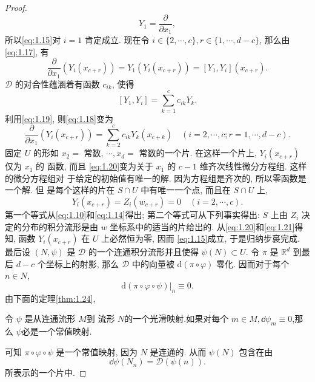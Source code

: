 \begin{proof}
\begin{equation}
    \label{eq:1.17}
    Y_1=\frac{\partial}{\partial x_1},
\end{equation}
所以\eqref{eq:1.15}对 $i=1$ 肯定成立. 现在令 $i \in\{2, \cdots, c\}, r \in\{1, \cdots, d-c\}$, 那么由\eqref{eq:1.17}, 有
\begin{equation}
    \label{eq:1.18}
    \frac{\partial}{\partial x_1}\left(Y_i\left(x_{c+r}\right)\right)=Y_1\left(Y_i\left(x_{c+r}\right)\right)=\left[Y_1, Y_i\right]\left(x_{c+r}\right) .
\end{equation}
$\mathscr{D}$ 的对合性蕴涵着有函数 $c_{i k}$, 使得
\begin{equation}
    \label{eq:1.19}
    \left[Y_1, Y_i\right]=\sum_{k=1}^c c_{i k} Y_k .
\end{equation}
利用\eqref{eq:1.19}, 则\eqref{eq:1.18}变为
\begin{equation}\label{eq:1.20}
    \frac{\partial}{\partial x_1}(Y_i (x_{c+r}))=\sum_{k=2}^c c_{ik} Y_k (x_{c+k}) \quad (i=2,\cdots,c; r=1,\cdots,d-c).
\end{equation}
固定 $U$ 的形如 $x_2=$ 常数, $\cdots, x_d=$ 常数的一个片. 在这样一个片上, $Y_i\left(x_{c+r}\right)$ 仅为 $x_1$ 的 函数, 而且 \eqref{eq:1.20}变为关于 $x_1$ 的 $c-1$ 维齐次线性微分方程组. 这样的微分方程组对 于给定的初始值有唯一的解. 因为方程组是齐次的, 所以零函数是一个解. 但 是每个这样的片在 $S \cap U$ 中有唯一一个点, 而且在 $S \cap U$ 上,
\begin{equation}
    \label{eq:1.21}
Y_i\left(x_{c+r}\right)=Z_i\left(w_{c+r}\right)=0 \quad(i=2, \cdots, c) .
\end{equation}
第一个等式从\eqref{eq:1.10}和\eqref{eq:1.14}得出; 第二个等式可从下列事实得出: $S$ 上由 $Z_i$ 决定的分布的积分流形是由 $w$ 坐标系中的适当的片给出的. 从\eqref{eq:1.20}和\eqref{eq:1.21}得知, 函数 $Y_i\left(x_{c+r}\right)$ 在 $U$ 上必然恒为零, 因而 \eqref{eq:1.15}成立, 于是归纳步裛完成.
最后设 $(N, \psi)$ 是 $\mathscr{D}$ 的一个连通积分流形并且使得 $\psi(N) \subset U$. 令 $\pi$ 是 $\mathbb{R}^d$ 到最后 $d-c$ 个坐标上的射影, 那么 $\mathscr{D}$ 中的向量被 $\mathrm{d}(\pi \circ \varphi)$ 零化. 因而对于每个 $n \in N$,
$$
\left.\mathrm{d}(\pi \circ \varphi \circ \psi)\right|_n \equiv 0 .
$$
由下面的定理\ref{thm:1.24},
\begin{thm}\label{thm:1.24}
    令 $\psi$ 是从连通流形 $M$到 流形 $N$的一个光滑映射.如果对每个 $m\in M,\dd \psi_m\equiv 0$,那么 $\psi$必是一个常值映射.
\end{thm}
可知 $\pi \circ \varphi \circ \psi$ 是一个常值映射, 因为 $N$ 是连通的. 从而 $\psi(N)$ 包含在由
\begin{equation}
    \dd \psi(N_n)=\mathscr{D}(\psi(n)).
\end{equation}
所表示的一个片中.
\end{proof}

